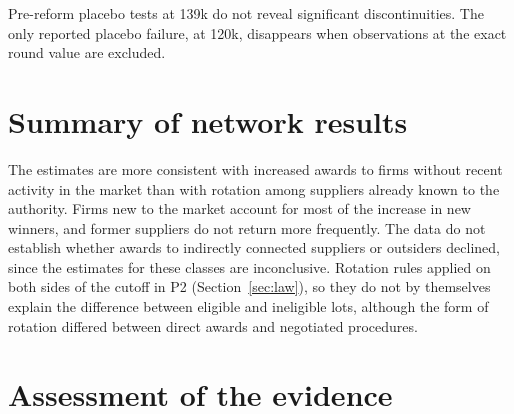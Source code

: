 \documentclass[11pt,a4paper]{article}
\begin{document}
Pre-reform placebo tests at \texteuro139k do not reveal significant discontinuities. The only reported placebo failure, at \texteuro120k, disappears when observations at the exact round value are excluded.

\section{Summary of network results}

The estimates are more consistent with increased awards to firms without recent activity in the market than with rotation among suppliers already known to the authority. Firms new to the market account for most of the increase in new winners, and former suppliers do not return more frequently. The data do not establish whether awards to indirectly connected suppliers or outsiders declined, since the estimates for these classes are inconclusive. Rotation rules applied on both sides of the cutoff in P2 (Section~\ref{sec:law}), so they do not by themselves explain the difference between eligible and ineligible lots, although the form of rotation differed between direct awards and negotiated procedures.

\section{Assessment of the evidence}
\end{document}
